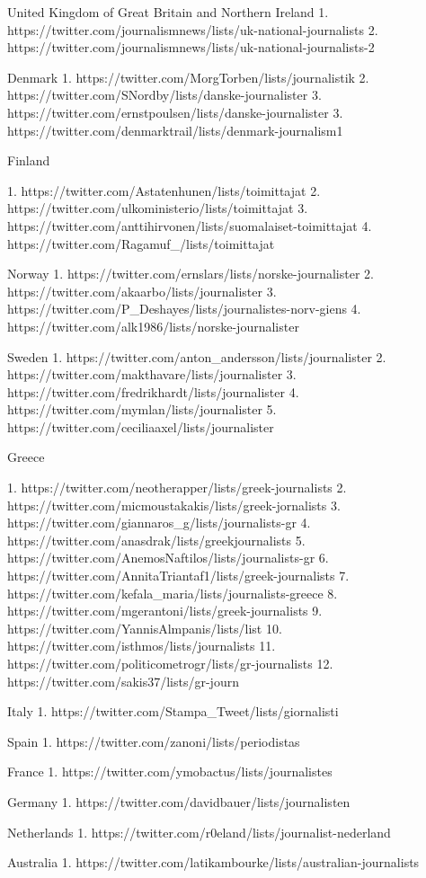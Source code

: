 United Kingdom of Great Britain and Northern Ireland
1. https://twitter.com/journalismnews/lists/uk-national-journalists
2. https://twitter.com/journalismnews/lists/uk-national-journalists-2

Denmark
1. https://twitter.com/MorgTorben/lists/journalistik
2. https://twitter.com/SNordby/lists/danske-journalister
3. https://twitter.com/ernstpoulsen/lists/danske-journalister
3. https://twitter.com/denmarktrail/lists/denmark-journalism1

Finland

1. https://twitter.com/Astatenhunen/lists/toimittajat
2. https://twitter.com/ulkoministerio/lists/toimittajat
3. https://twitter.com/anttihirvonen/lists/suomalaiset-toimittajat
4. https://twitter.com/Ragamuf\_/lists/toimittajat

Norway
1. https://twitter.com/ernslars/lists/norske-journalister
2. https://twitter.com/akaarbo/lists/journalister
3. https://twitter.com/P\_Deshayes/lists/journalistes-norv-giens
4. https://twitter.com/alk1986/lists/norske-journalister

Sweden
1. https://twitter.com/anton\_andersson/lists/journalister
2. https://twitter.com/makthavare/lists/journalister
3. https://twitter.com/fredrikhardt/lists/journalister
4. https://twitter.com/mymlan/lists/journalister
5. https://twitter.com/ceciliaaxel/lists/journalister

Greece

1. https://twitter.com/neotherapper/lists/greek-journalists
2. https://twitter.com/micmoustakakis/lists/greek-jornalists
3. https://twitter.com/giannaros\_g/lists/journalists-gr
4. https://twitter.com/anasdrak/lists/greekjournalists
5. https://twitter.com/AnemosNaftilos/lists/journalists-gr
6. https://twitter.com/AnnitaTriantaf1/lists/greek-journalists
7. https://twitter.com/kefala\_maria/lists/journalists-greece
8. https://twitter.com/mgerantoni/lists/greek-journalists
9. https://twitter.com/YannisAlmpanis/lists/list
10. https://twitter.com/isthmos/lists/journalists
11. https://twitter.com/politicometrogr/lists/gr-journalists
12. https://twitter.com/sakis37/lists/gr-journ

Italy
1. https://twitter.com/Stampa\_Tweet/lists/giornalisti

Spain
1. https://twitter.com/zanoni/lists/periodistas

France
1. https://twitter.com/ymobactus/lists/journalistes
 
Germany 
1. https://twitter.com/davidbauer/lists/journalisten

Netherlands 
1. https://twitter.com/r0eland/lists/journalist-nederland

Australia 
1. https://twitter.com/latikambourke/lists/australian-journalists
